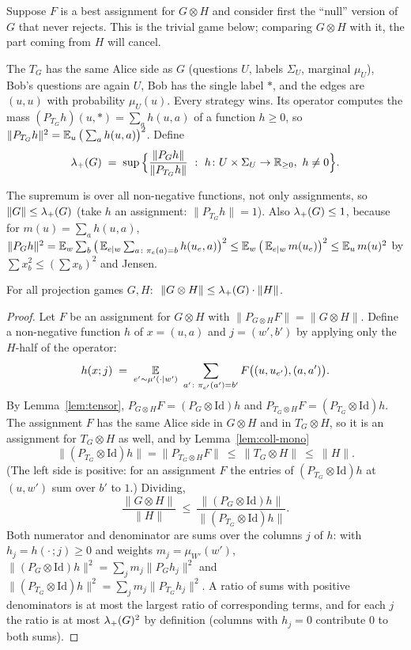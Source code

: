 Suppose $F$ is a best assignment for $G\otimes H$ and consider first the ``null'' version of $G$ that never rejects.  This is the trivial game below; comparing $G\otimes H$ with it, the part coming from $H$ will cancel.

\begin{definition}\label{def:lamp}
The  $T_G$ has the same Alice side as $G$ (questions $U$, labels $\Sigma_U$, marginal $\mu_U$), Bob's questions are again $U$, Bob has the single label $\ast$, and the edges are $(u,u)$ with probability $\mu_U(u)$.  Every strategy wins.  Its operator computes the mass $(P_{T_G}h)(u,\ast)=\sum_ah(u,a)$ of a function $h\ge0$, so $\|P_{T_G}h\|^2=\operatorname*{\mathbb{E}}_u\big(\sum_ah(u,a)\big)^2$.
Define
\[
  \lamp(G)\;=\;\sup\Big\{\frac{\|P_Gh\|}{\|P_{T_G}h\|}\ :\ h\colon U\times\Sigma_U\to\R_{\ge0},\ h\ne0\Big\}.
\]
\end{definition}

\noindent
The supremum is over all non-negative functions, not only assignments, so $\|G\|\le\lambda_{+}(G)$ (take $h$ an assignment: $\|P_{T_G}h\|=1$).  Also $\lambda_{+}(G)\le1$, because for $m(u)=\sum_ah(u,a)$,
$\|P_Gh\|^2=\operatorname*{\mathbb{E}}_w\sum_b\big(\operatorname*{\mathbb{E}}_{e\mid w}\sum_{a\colon\pi_e(a)=b}h(u_e,a)\big)^2\le\operatorname*{\mathbb{E}}_w\big(\operatorname*{\mathbb{E}}_{e\mid w}m(u_e)\big)^2\le\operatorname*{\mathbb{E}}_um(u)^2$ by $\sum x_b^2\le(\sum x_b)^2$ and Jensen.

\begin{theorem}\label{thm:product}
For all projection games $G,H$: $\ \|G\otimes H\|\le\lambda_{+}(G)\cdot\|H\|$.
\end{theorem}
\begin{proof}
Let $F$ be an assignment for $G\otimes H$ with $\|P_{G\otimes H}F\|=\|G\otimes H\|$.  Define a non-negative function $h$ of $x=(u,a)$ and $j=(w',b')$ by applying only the $H$-half of the operator:
\[
  h(x;j)\;=\;\E_{e'\sim\mu'(\cdot\mid w')}\ \sum_{a'\colon\pi_{e'}(a')=b'}F\big((u,u_{e'}),(a,a')\big).
\]
By Lemma~\ref{lem:tensor}, $P_{G\otimes H}F=(P_G\otimes\mathrm{Id})h$ and $P_{T_G\otimes H}F=(P_{T_G}\otimes\mathrm{Id})h$.
The assignment $F$ has the same Alice side in $G\otimes H$ and in $T_G\otimes H$, so it is an assignment for $T_G\otimes H$ as well, and by Lemma~\ref{lem:coll-mono}
\[
  \|(P_{T_G}\otimes\mathrm{Id})h\|=\|P_{T_G\otimes H}F\|\ \le\ \|T_G\otimes H\|\ \le\ \|H\|.
\]
(The left side is positive: for an assignment $F$ the entries of $(P_{T_G}\otimes\mathrm{Id})h$ at $(u,w')$ sum over $b'$ to $1$.)  Dividing,
\[
  \frac{\|G\otimes H\|}{\|H\|}\ \le\ \frac{\|(P_G\otimes\mathrm{Id})h\|}{\|(P_{T_G}\otimes\mathrm{Id})h\|}.
\]
Both numerator and denominator are sums over the columns $j$ of $h$: with $h_j=h(\cdot\,;j)\ge0$ and weights $m_j=\mu_{W'}(w')$,
$\|(P_G\otimes\mathrm{Id})h\|^2=\sum_jm_j\|P_Gh_j\|^2$ and $\|(P_{T_G}\otimes\mathrm{Id})h\|^2=\sum_jm_j\|P_{T_G}h_j\|^2$.
A ratio of sums with positive denominators is at most the largest ratio of corresponding terms, and for each $j$ the ratio is at most $\lambda_{+}(G)^2$ by definition (columns with $h_j=0$ contribute $0$ to both sums).
\end{proof}

